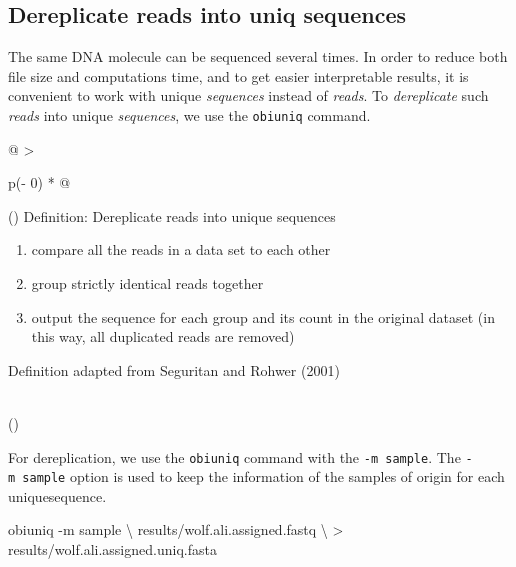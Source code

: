 \documentclass[
  letterpaper,
  DIV=11,
  numbers=noendperiod]{scrreprt}
\newenvironment{Shaded}{\begin{snugshade}}{\end{snugshade}}
\newcommand{\AttributeTok}[1]{\textcolor[rgb]{0.40,0.45,0.13}{#1}}
\newcommand{\DataTypeTok}[1]{\textcolor[rgb]{0.68,0.00,0.00}{#1}}
\newcommand{\ExtensionTok}[1]{\textcolor[rgb]{0.00,0.23,0.31}{#1}}
\newcommand{\NormalTok}[1]{\textcolor[rgb]{0.00,0.23,0.31}{#1}}
\newcommand{\OperatorTok}[1]{\textcolor[rgb]{0.37,0.37,0.37}{#1}}
\providecommand{\tightlist}{%
  \setlength{\itemsep}{0pt}\setlength{\parskip}{0pt}}\usepackage{longtable,booktabs,array}
\begin{document}
\hypertarget{dereplicate-reads-into-uniq-sequences}{%
\subsection{Dereplicate reads into uniq
sequences}\label{dereplicate-reads-into-uniq-sequences}}

The same DNA molecule can be sequenced several times. In order to reduce
both file size and computations time, and to get easier interpretable
results, it is convenient to work with unique \emph{sequences} instead
of \emph{reads}. To \emph{dereplicate} such \emph{reads} into unique
\emph{sequences}, we use the \texttt{obiuniq} command.

\begin{longtable}[]{@{}
  >{\raggedright\arraybackslash}p{(\columnwidth - 0\tabcolsep) * }@{}}
\toprule()
\endhead
Definition: Dereplicate reads into unique sequences \\
\begin{minipage}[t]{\linewidth}\raggedright
\begin{enumerate}
\def\labelenumi{\arabic{enumi}.}
\tightlist
\item
  compare all the reads in a data set to each other
\item
  group strictly identical reads together
\item
  output the sequence for each group and its count in the original
  dataset (in this way, all duplicated reads are removed)
\end{enumerate}

Definition adapted from Seguritan and Rohwer (2001)
\end{minipage} \\
\bottomrule()
\end{longtable}

For dereplication, we use the \texttt{obiuniq} command with the
\texttt{-m\ sample}. The \texttt{-m\ sample} option is used to keep the
information of the samples of origin for each uniquesequence.

\begin{Shaded}
\begin{Highlighting}[]
\ExtensionTok{obiuniq} \AttributeTok{{-}m}\NormalTok{ sample }\DataTypeTok{\textbackslash{}}
\NormalTok{        results/wolf.ali.assigned.fastq }\DataTypeTok{\textbackslash{}}
        \OperatorTok{\textgreater{}}\NormalTok{ results/wolf.ali.assigned.uniq.fasta}
\end{Highlighting}
\end{Shaded}
\end{document}
